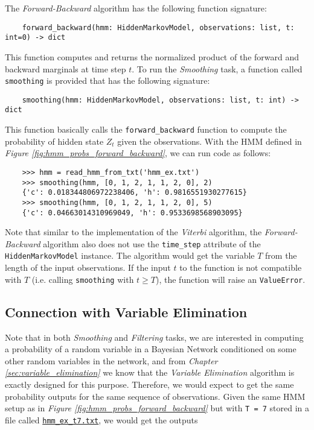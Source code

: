 \documentclass{article}
\theoremstyle{definition}
\begin{document}
The \textit{Forward-Backward} algorithm has the following function signature:

\begin{verbatim}
    forward_backward(hmm: HiddenMarkovModel, observations: list, t: int=0) -> dict
\end{verbatim}

This function computes and returns the normalized product of the forward and backward marginals at time step \(t\). To run the \textit{Smoothing} task, a function called \texttt{smoothing} is provided that has the following signature:

\begin{verbatim}
    smoothing(hmm: HiddenMarkovModel, observations: list, t: int) -> dict
\end{verbatim}

This function basically calls the \texttt{forward\_backward} function to compute the probability of hidden state \(Z_t\) given the observations. With the HMM defined in \textit{Figure \ref{fig:hmm_probs_forward_backward}}, we can run code as follows:

\begin{verbatim}
    >>> hmm = read_hmm_from_txt('hmm_ex.txt')
    >>> smoothing(hmm, [0, 1, 2, 1, 1, 2, 0], 2)
    {'c': 0.018344806972238406, 'h': 0.9816551930277615}
    >>> smoothing(hmm, [0, 1, 2, 1, 1, 2, 0], 5)
    {'c': 0.04663014310969049, 'h': 0.9533698568903095}
\end{verbatim}

Note that similar to the implementation of the \textit{Viterbi} algorithm, the \textit{Forward-Backward} algorithm also does not use the \texttt{time\_step} attribute of the \texttt{HiddenMarkovModel} instance. The algorithm would get the variable \(T\) from the length of the input observations. If the input \(t\) to the function is not compatible with \(T\) (i.e. calling \texttt{smoothing} with \(t \geq T\)), the function will raise an \texttt{ValueError}.

\subsection{Connection with Variable Elimination}

Note that in both \textit{Smoothing} and \textit{Filtering} tasks, we are interested in computing a probability of a random variable in a Bayesian Network conditioned on some other random variables in the network, and from \textit{Chapter \ref{sec:variable_elimination}} we know that the \textit{Variable Elimination} algorithm is exactly designed for this purpose. Therefore, we would expect to get the same probability outputs for the same sequence of observations. Given the same HMM setup as in \textit{Figure \ref{fig:hmm_probs_forward_backward}} but with \texttt{T = 7} stored in a file called \href{https://github.com/BullDF/bayes_network/blob/main/hmm_ex_t7.txt}{\texttt{hmm\_ex\_t7.txt}}, we would get the outputs
\end{document}
